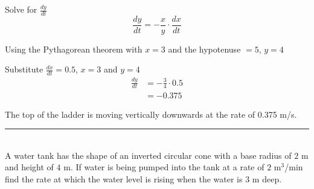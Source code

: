 Solve for $\frac{d y}{d t}$
\begin{equation*}\frac{d y}{d t} = -\frac{x}{y} \cdot \frac{d x}{d t}
\end{equation*}

Using the Pythagorean theorem with $x=3$ and the hypotenuse $=5$, $y=4$ 

Substitute $\frac{d x}{d t} =0.5$, $x =3$ and $y =4$
\begin{align*}\frac{d y}{d t} &  =  -\frac{3}{4} \cdot 0.5 \\
 &  =  -0.375\end{align*}

The top of the ladder is moving vertically downwards at the rate of 0.375 m/s.\\ 
\rule{6.8cm}{0.5pt}\\
\example A water tank has the shape of an inverted circular cone with a base radius of $2$ $\mbox{m}$ and height of $4$ $\mbox{m}$. If water is being pumped into
the tank at a rate of $2$ $\mathrm{m}^{3}$/$\mbox{min}$ find the rate at which the water level is rising when the water is $3$ $\mbox{m}$ deep. 


